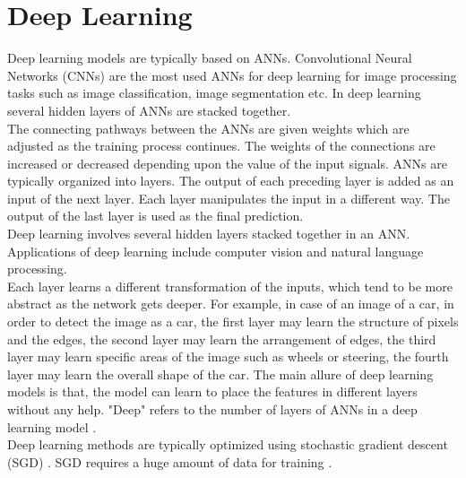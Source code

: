 \section{Deep Learning}
Deep learning models are typically based on ANNs. Convolutional Neural Networks (CNNs) \cite{fukushima1982} are the most used ANNs for deep learning for image processing tasks such as image classification, image segmentation etc. In deep learning several hidden layers of ANNs are stacked together. \\
The connecting pathways between the ANNs are given weights which are adjusted as the training process continues. The weights of the connections are increased or decreased depending upon the value of the input signals. ANNs are typically organized into layers. The output of each preceding layer is added as an input of the next layer. Each layer manipulates the input in a different way. The output of the last layer is used as the final prediction. \\
Deep learning involves several hidden layers stacked together in an ANN. Applications of deep learning include computer vision and natural language processing. \\
Each layer learns a different transformation of the inputs, which tend to be more abstract as the network gets deeper. For example, in case of an image of a car, in order to detect the image as a car, the first layer may learn the structure of pixels and the edges, the second layer may learn the arrangement of edges, the third layer may learn specific areas of the image such as wheels or steering, the fourth layer may learn the overall shape of the car. The main allure of deep learning models is that, the model can learn to place the features in different layers without any help. "Deep" refers to the number of layers of ANNs in a deep learning model \cite{bengio2013}. \\
Deep learning methods are typically optimized using stochastic gradient descent (SGD) \cite{bottou2010}. SGD requires a huge amount of data for training \cite{sun2017}.

